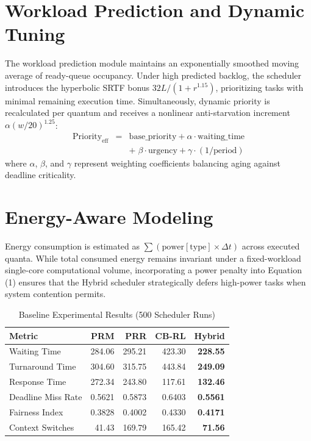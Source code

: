 \documentclass[conference]{IEEEtran}
\providecommand{\toprule}{\hline\hline}
\providecommand{\midrule}{\hline}
\providecommand{\bottomrule}{\hline\hline}
\begin{document}
\section{Workload Prediction and Dynamic Tuning}
The workload prediction module maintains an exponentially smoothed moving average of ready-queue occupancy. Under high predicted backlog, the scheduler introduces the hyperbolic SRTF bonus $32L/(1+r^{1.15})$, prioritizing tasks with minimal remaining execution time. Simultaneously, dynamic priority is recalculated per quantum and receives a nonlinear anti-starvation increment $\alpha(w/20)^{1.25}$:
\begin{eqnarray*}
\mathrm{Priority}_{\mathrm{eff}} &=& \mathrm{base\_priority} + \alpha \cdot \mathrm{waiting\_time} \\
&& +\; \beta \cdot \mathrm{urgency} + \gamma \cdot (1/\mathrm{period})
\end{eqnarray*}
where $\alpha$, $\beta$, and $\gamma$ represent weighting coefficients balancing aging against deadline criticality.

\section{Energy-Aware Modeling}
Energy consumption is estimated as $\sum (\mathrm{power}[\mathrm{type}] \times \Delta t)$ across executed quanta. While total consumed energy remains invariant under a fixed-workload single-core computational volume, incorporating a power penalty into Equation (1) ensures that the Hybrid scheduler strategically defers high-power tasks when system contention permits.

\begin{table}[htbp]
\caption{Baseline Experimental Results (500 Scheduler Runs)}
\begin{center}
\begin{tabular}{lrrrr}
\toprule
\textbf{Metric} & \textbf{PRM} & \textbf{PRR} & \textbf{CB-RL} & \textbf{Hybrid} \\
\midrule
Waiting Time & 284.06 & 295.21 & 423.30 & \textbf{228.55} \\
Turnaround Time & 304.60 & 315.75 & 443.84 & \textbf{249.09} \\
Response Time & 272.34 & 243.80 & 117.61 & \textbf{132.46} \\
Deadline Miss Rate & 0.5621 & 0.5873 & 0.6403 & \textbf{0.5561} \\
Fairness Index & 0.3828 & 0.4002 & 0.4330 & \textbf{0.4171} \\
Context Switches & 41.43 & 169.79 & 165.42 & \textbf{71.56} \\
\bottomrule
\end{tabular}
\label{tab:results}
\end{center}
\end{table}
\end{document}

